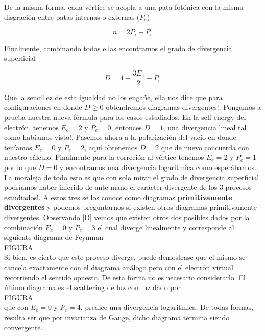\documentclass{article}
\numberwithin{equation}{section}
\begin{document}
De la misma forma, cada vértice se acopla a una pata fotónica con la misma disgración entre patas internas o externas ($ P_e $)

\begin{equation}\label{key}
n=2P_i + P_e
\end{equation}

Finalmente, combinando todas ellas encontramos el grado de divergencia superficial

\begin{equation}\label{D}
D=4-\frac{3E_e}{2}-P_e
\end{equation}

Que la sencillez de esta igualdad no los engañe, ella nos dice que para configuraciones en donde $ D\geq0 $ obtendremos diagramas divergentes!. Pongamos a prueba nuestra nueva fórmula para los casos estudiados. En la self-energy del electrón, tenemos $ E_e=2 $ y $ P_e=0 $, entonces $ D=1 $, una divergencia lineal tal como habíamos visto!. Pasemos ahora a la polarización del vacío en donde teníamos $ E_e=0 $ y $ P_e=2 $, aquí obtenemos $ D=2 $ que de nuevo concuerda con nuestro cálculo. Finalmente para la correción al vértice tenemos $ E_e=2 $ y $ P_e=1 $ por lo que $ D=0 $ y encontramos una divergencia logaritmica como esperábamos. La moraleja de todo esto es que con solo mirar el grado de divergencia superficial podríamos haber inferido de ante mano el carácter divergente de los 3 procesos estudiados!. A estos tres se los conoce como diagramas \textbf{primitivamente divergentes} y podemos preguntarnos si existen otros diagramas primitivamente divergentes. Observando  \ref{D} vemos que existen otros dos posibles dados por la combinación $ E_e=0 $ y $ P_e=3 $ el cual diverge linealmente y corresponde al siguiente diagrama de Feynman\\

FIGURA\\

Si bien, es cierto que este proceso diverge, puede demostrase que el mismo se cancela exactamente con el diagrama análogo pero con el electrón virtual recorriendo el sentido opuesto. De esta forma no es necesario considerarlo. El último diagrama es el scattering de luz con luz dado por\\

FIGURA\\

que con $ E_e=0 $ y $ P_e=4 $, predice una divergencia logaritmica. De todas formas, resulta ser que por invarianza de Gauge, dicho diagrama termina siendo convergente.\\
\end{document}
